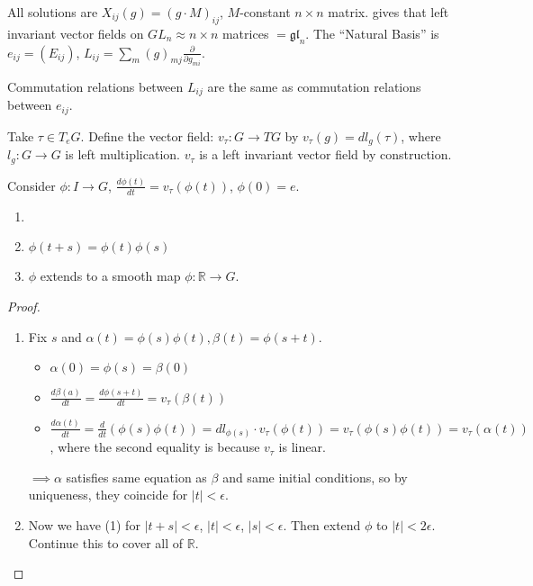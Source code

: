  \begin{example}
 All solutions are $X_{ij}(g) = (g\cdot M)_{ij}$, $M$-constant $n\times n$ matrix.
 gives that left invariant vector fields on $GL_n \approx n\times n$ matrices
 $=\mathfrak{gl}_n$. The ``Natural Basis'' is $e_{ij}=(E_{ij})$, $L_{ij}=\sum_m
 (g)_{mj}\frac{\partial}{\partial g_{mi}}$. 
 \end{example}
 \begin{example}
 Commutation relations between $L_{ij}$ are the same as commutation relations between
 $e_{ij}$.
 \end{example}

 Take $\tau \in T_eG$.  Define the vector field: $v_{\tau}: G\rightarrow TG$ by
 $v_{\tau}(g)=dl_g(\tau)$, where $l_g : G\rightarrow G$ is left multiplication.
 $v_{\tau}$ is a left invariant vector field by construction.

 Consider $\phi: I \rightarrow G$, $\frac{d\phi(t)}{dt} =
 v_{\tau}(\phi(t))$, $\phi(0)=e$.

 \begin{proposition}
 \begin{enumerate}\item[]
 \item $\phi(t+s) = \phi(t)\phi(s)$
 \item $\phi$ extends to a smooth map $\phi: \mathbb{R} \rightarrow G$.
 \end{enumerate}
 \end{proposition}

 \begin{proof}
 \begin{enumerate}
 \item Fix $s$ and $\alpha(t)=\phi(s)\phi(t), \beta(t)=\phi(s+t)$.
    \begin{itemize}
    \item $\alpha(0)=\phi(s)=\beta(0)$
    \item $\frac{d\beta(a)}{dt}=\frac{d\phi(s+t)}{dt} = v_{\tau}(\beta(t))$
    \item $\frac{d\alpha(t)}{dt}=\frac{d}{dt}(\phi(s)\phi(t))
    = dl_{\phi(s)}\cdot v_{\tau}(\phi(t)) = v_{\tau}(\phi(s)\phi(t)) =
    v_{\tau}(\alpha(t))$, where the second equality is because $v_{\tau}$ is linear.
    \end{itemize}
 $\implies \alpha$ satisfies same
 equation as $\beta$ and same initial conditions, so by uniqueness,
 they coincide for $|t|<\epsilon$.
 \item Now we have (1) for $|t+s|<\epsilon$, $|t|<\epsilon$,
 $|s|<\epsilon$.  Then extend $\phi$ to $|t|<2\epsilon$.  Continue
 this to cover all of $\mathbb{R}$.
 \end{enumerate}
 \end{proof}

